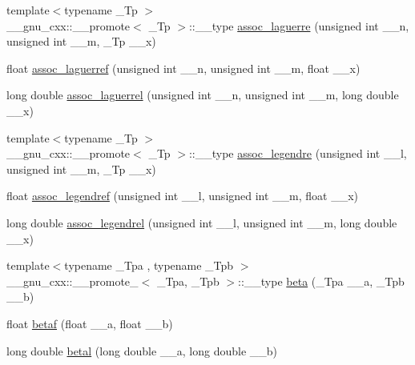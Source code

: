 \begin{DoxyCompactItemize}
\item 
{\footnotesize template$<$typename \+\_\+\+Tp $>$ }\\\+\_\+\+\_\+gnu\+\_\+cxx\+::\+\_\+\+\_\+promote$<$ \+\_\+\+Tp $>$\+::\+\_\+\+\_\+type \hyperlink{group__tr29124__math__spec__func_ga377bb7e038c464a27dfe0573fd2d7b33}{assoc\+\_\+laguerre} (unsigned int \+\_\+\+\_\+n, unsigned int \+\_\+\+\_\+m, \+\_\+\+Tp \+\_\+\+\_\+x)
\item 
float \hyperlink{group__tr29124__math__spec__func_gaf83d98f350a1cfcebee6a1f723cf90d2}{assoc\+\_\+laguerref} (unsigned int \+\_\+\+\_\+n, unsigned int \+\_\+\+\_\+m, float \+\_\+\+\_\+x)
\item 
long double \hyperlink{group__tr29124__math__spec__func_gac8e245671fb2df5de5fd978d03081f6c}{assoc\+\_\+laguerrel} (unsigned int \+\_\+\+\_\+n, unsigned int \+\_\+\+\_\+m, long double \+\_\+\+\_\+x)
\item 
{\footnotesize template$<$typename \+\_\+\+Tp $>$ }\\\+\_\+\+\_\+gnu\+\_\+cxx\+::\+\_\+\+\_\+promote$<$ \+\_\+\+Tp $>$\+::\+\_\+\+\_\+type \hyperlink{group__tr29124__math__spec__func_ga355349f79119c1fd1e2a9351cec57f0f}{assoc\+\_\+legendre} (unsigned int \+\_\+\+\_\+l, unsigned int \+\_\+\+\_\+m, \+\_\+\+Tp \+\_\+\+\_\+x)
\item 
float \hyperlink{group__tr29124__math__spec__func_ga3ced07ddd24bf4af56e2712d148e7f57}{assoc\+\_\+legendref} (unsigned int \+\_\+\+\_\+l, unsigned int \+\_\+\+\_\+m, float \+\_\+\+\_\+x)
\item 
long double \hyperlink{group__tr29124__math__spec__func_ga55977b425a539146f060dec1c8003344}{assoc\+\_\+legendrel} (unsigned int \+\_\+\+\_\+l, unsigned int \+\_\+\+\_\+m, long double \+\_\+\+\_\+x)
\item 
{\footnotesize template$<$typename \+\_\+\+Tpa , typename \+\_\+\+Tpb $>$ }\\\+\_\+\+\_\+gnu\+\_\+cxx\+::\+\_\+\+\_\+promote\+\_$<$ \+\_\+\+Tpa, \+\_\+\+Tpb $>$\+::\+\_\+\+\_\+type \hyperlink{group__tr29124__math__spec__func_ga6a7220c87c942db48b18b527d92bbd2d}{beta} (\+\_\+\+Tpa \+\_\+\+\_\+a, \+\_\+\+Tpb \+\_\+\+\_\+b)
\item 
float \hyperlink{group__tr29124__math__spec__func_ga12dc61ee4c09172151cf092ed387e203}{betaf} (float \+\_\+\+\_\+a, float \+\_\+\+\_\+b)
\item 
long double \hyperlink{group__tr29124__math__spec__func_ga8caca1cef099f41a88111209c36ce06c}{betal} (long double \+\_\+\+\_\+a, long double \+\_\+\+\_\+b)

\end{DoxyCompactItemize}
